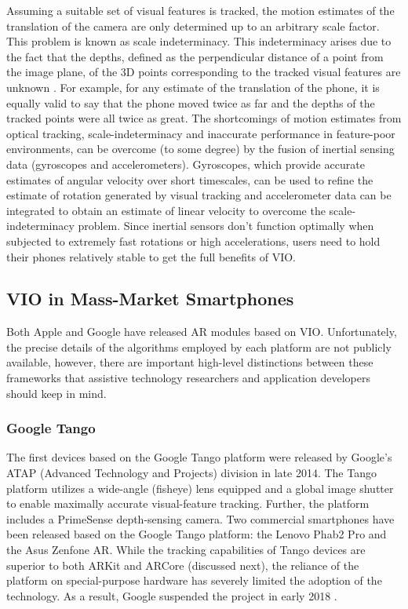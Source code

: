 \documentclass[chi_draft]{sigchi}
\begin{document}
Assuming a suitable set of visual features is tracked, the motion estimates of the translation of the camera are only determined up to an arbitrary scale factor.  This problem is known as scale indeterminacy.  This indeterminacy arises due to the fact that the depths, defined as the perpendicular distance of a point from the image plane, of the 3D points corresponding to the tracked visual features are unknown \cite{Hartley2004}.  For example, for any estimate of the translation of the phone, it is equally valid to say that the phone moved twice as far and the depths of the tracked points were all twice as great.  The shortcomings of motion estimates from optical tracking, scale-indeterminacy and inaccurate performance in feature-poor environments, can be overcome (to some degree) by the fusion of inertial sensing data (gyroscopes and accelerometers).  Gyroscopes, which provide accurate estimates of angular velocity over short timescales, can be used to refine the estimate of rotation generated by visual tracking and accelerometer data can be integrated to obtain an estimate of linear velocity to overcome the scale-indeterminacy problem.  Since inertial sensors don't function optimally when subjected to extremely fast rotations or high accelerations, users need to hold their phones relatively stable to get the full benefits of VIO.

\subsection{VIO in Mass-Market Smartphones}
Both Apple and Google have released AR modules based on VIO.  Unfortunately, the precise details of the algorithms employed by each platform are not publicly available, however, there are important high-level distinctions between these frameworks that assistive technology researchers and application developers should keep in mind.

\subsubsection{Google Tango}
The first devices based on the Google Tango platform were released by Google's ATAP (Advanced Technology and Projects) division in late 2014.  The Tango platform utilizes a wide-angle (fisheye) lens equipped and a global image shutter to enable maximally accurate visual-feature tracking.  Further, the platform includes a PrimeSense depth-sensing camera.  Two commercial smartphones have been released based on the Google Tango platform: the Lenovo Phab2 Pro and the Asus Zenfone AR.  While the tracking capabilities of Tango devices are superior to both ARKit and ARCore (discussed next), the reliance of the platform on special-purpose hardware has severely limited the adoption of the technology.  As a result, Google suspended the project in early 2018 \cite{tangoretired}.
\end{document}

